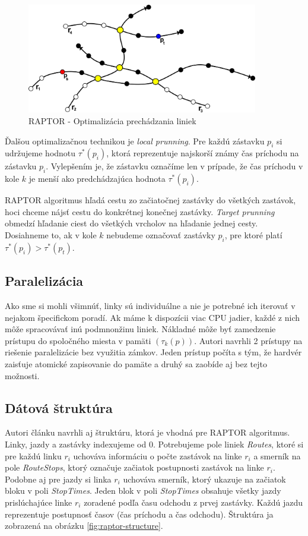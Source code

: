 \begin{figure}[H]
\centerline{\includegraphics[width=0.9\textwidth]{images/raptor-optimal}}
\caption[RAPTOR - Optimalizácia prechádzania liniek]{RAPTOR - Optimalizácia prechádzania liniek}
\label{fig:raptor-optimal}
\end{figure}

Ďalšou optimalizačnou technikou je \textit{local prunning}. Pre každú zástavku $p_i$ si udržujeme hodnotu $\tau^*(p_i)$, ktorá reprezentuje najskorší známy čas príchodu na zástavku $p_i$. Vylepšením je, že zástavku označíme len v prípade, že čas príchodu v kole $k$ je menší ako predchádzajúca hodnota $\tau^*(p_i)$. 

RAPTOR algoritmus hľadá cestu zo začiatočnej zastávky do všetkých zastávok, hoci chceme nájsť cestu do konkrétnej konečnej zastávky. \textit{Target prunning} obmedzí hľadanie ciest do všetkých vrcholov na hľadanie jednej cesty. Dosiahneme to, ak v kole $k$ nebudeme označovať zastávky $p_i$, pre ktoré platí $\tau^*(p_i) > \tau^*(p_t)$.   

\subsection{Paralelizácia}
Ako sme si mohli všimnúť, linky sú individuálne a nie je potrebné ich iterovať v nejakom špecifickom poradí. Ak máme k dispozícii viac CPU jadier, každé z nich môže spracovávať inú podmnonžinu liniek. Nákladné môže byť zamedzenie prístupu do spoločného miesta v pamäti $(\tau_k(p))$. Autori navrhli 2 prístupy na riešenie paralelizácie bez využitia zámkov. Jeden prístup počíta s tým, že hardvér zaisťuje atomické zapisovanie do pamäte a druhý sa zaobíde aj bez tejto možnosti. 

\subsection{Dátová štruktúra}
Autori článku navrhli aj štruktúru, ktorá je vhodná pre RAPTOR algoritmus. Linky, jazdy a zastávky indexujeme od $0$. Potrebujeme pole liniek \textit{Routes}, ktoré si pre každú linku $r_i$ uchováva informáciu o počte zastávok na linke $r_i$ a smerník na pole \textit{RouteStops}, ktorý označuje začiatok postupnosti zastávok na linke $r_i$. Podobne aj pre jazdy si linka $r_i$ uchováva smerník, ktorý ukazuje na začiatok bloku v poli \textit{StopTimes}. Jeden blok v poli \textit{StopTimes} obsahuje všetky jazdy prislúchajúce linke $r_i$ zoradené podľa času odchodu z prvej zastávky. Každú jazdu reprezentuje postupnosť časov (čas príchodu a čas odchodu). Štruktúra ja zobrazená na obrázku \ref{fig:raptor-structure}. 

